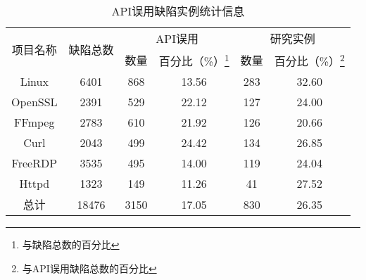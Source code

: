 \begin{table}[t]
	\centering
	\begin{minipage}[t]{0.85\linewidth} %
		\caption{API误用缺陷实例统计信息}
		\label{tab:2-3-studied}
		\begin{tabular}{@{\extracolsep{4pt}}cccccc@{}}
			\hline
			\multirow{2}{*}{项目名称} & \multirow{2}{*}{缺陷总数} & \multicolumn{2}{c}{API误用}& \multicolumn{2}{c}{研究实例}\\
			\cline{3-4} \cline{5-6}
			&  & 数量 & 百分比（\%）\footnote{与缺陷总数的百分比} & 数量& 百分比（\%）\footnote{与API误用缺陷总数的百分比} \\
			\hline
			Linux & 6401 & 868 & 13.56 & 283 & 32.60 \\
			OpenSSL & 2391 & 529 & 22.12 &127  & 24.00 \\
			FFmpeg & 2783 & 610 & 21.92 & 126 & 20.66 \\
			Curl & 2043 & 499 & 24.42 & 134 & 26.85 \\
			FreeRDP & 3535 & 495 & 14.00 & 119 & 24.04 \\
			Httpd & 1323 & 149 & 11.26 & 41 & 27.52 \\
			\hline
			总计 & 18476 & 3150 & 17.05 & 830 & 26.35 \\
			\hline
		\end{tabular}
	\end{minipage}
\end{table}